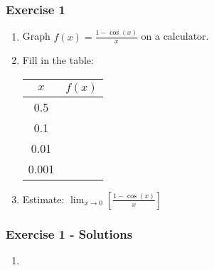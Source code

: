 \documentclass[12pt]{beamer}
\begin{document}
\begin{frame}
	\frametitle{Exercise 1}
	\initclock
	\large
	\begin{enumerate}
		\item Graph $f(x) = \frac{1-\cos(x)}{x}$ on a calculator.
		\vspace*{\fill}
		\vspace*{\fill}
		\item Fill in the table:
		\small
		\begin{table}[]
			\begin{tabular}{c|c}
				$x$   & $f(x)$ \\ \hline
				0.5   &        \\
				0.1   &        \\
				0.01  &        \\
				0.001 &
			\end{tabular}
		\end{table}
		\large
		\vspace*{\fill}
		\vspace*{\fill}
		\item Estimate: $\displaystyle\lim_{x\to 0}\left[\frac{1-\cos(x)}{x}\right]$
	\end{enumerate}
	\vspace*{\fill}
	\vspace*{\fill}
	\vspace*{\fill}
	\vspace*{\fill}
	\crono
\end{frame}
\begin{frame}
	\frametitle{Exercise 1 - Solutions}
	\vspace*{\fill}
	\vspace*{\fill}
	\begin{enumerate}
		\item
		\begin{center}
		\end{center}
	\end{enumerate}
	\vspace*{\fill}
	\vspace*{\fill}
	\vspace*{\fill}
	\vspace*{\fill}
\end{frame}
\end{document}
